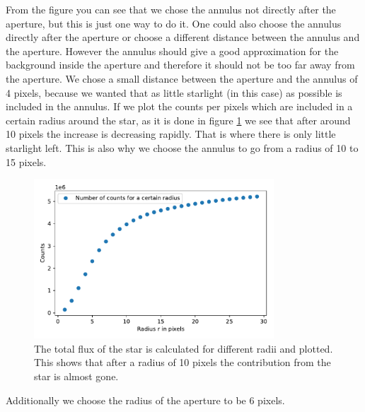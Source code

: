From the figure you can see that we chose the annulus not directly after the aperture, but this is just one way to do it. One could also choose the annulus directly after the aperture or choose a different distance between the annulus and the aperture. However the annulus should give a good approximation for the background inside the aperture and therefore it should not be too far away from the aperture. We chose a small distance between the aperture and the annulus of 4 pixels, because we wanted that as little starlight (in this case) as possible is included in the annulus. If we plot the counts per pixels which are included in a certain radius around the star, as it is done in figure \ref{fig:annulus_radi} we see that after around 10 pixels the increase is decreasing rapidly. That is where there is only little starlight left. This is also why we choose the annulus to go from a radius of 10 to 15 pixels. 
\begin{figure}[H]
	\centering
		\includegraphics[width=0.8\textwidth]{pics/CountsPerRadius.pdf}
		\caption{The total flux of the star is calculated for different radii and plotted. This shows that after a radius of 10 pixels the contribution from the star is almost gone.}
		\label{fig:annulus_radi}
\end{figure}
Additionally we choose the radius of the aperture to be 6 pixels.


